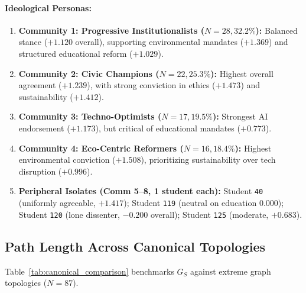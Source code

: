 \documentclass[10pt,twocolumn,a4paper]{article}
\begin{document}
\paragraph{Ideological Personas:}
\begin{enumerate}[noitemsep,topsep=1pt,leftmargin=1.2em]
    \item \textbf{Community 1: Progressive Institutionalists ($N = 28, 32.2\%$):} Balanced stance ($+1.120$ overall), supporting environmental mandates ($+1.369$) and structured educational reform ($+1.029$).
    \item \textbf{Community 2: Civic Champions ($N = 22, 25.3\%$):} Highest overall agreement ($+1.239$), with strong conviction in ethics ($+1.473$) and sustainability ($+1.412$).
    \item \textbf{Community 3: Techno-Optimists ($N = 17, 19.5\%$):} Strongest AI endorsement ($+1.173$), but critical of educational mandates ($+0.773$).
    \item \textbf{Community 4: Eco-Centric Reformers ($N = 16, 18.4\%$):} Highest environmental conviction ($+1.508$), prioritizing sustainability over tech disruption ($+0.996$).
    \item \textbf{Peripheral Isolates (Comm 5--8, 1 student each):} Student \texttt{40} (uniformly agreeable, $+1.417$); Student \texttt{119} (neutral on education $0.000$); Student \texttt{120} (lone dissenter, $-0.200$ overall); Student \texttt{125} (moderate, $+0.683$).
\end{enumerate}

\subsection{Path Length Across Canonical Topologies}
Table~\ref{tab:canonical_comparison} benchmarks $G_S$ against extreme graph topologies ($N=87$).

\begin{table}[h]
\centering
\small
\caption{Comparison of shortest path length and diameter against canonical graph topologies ($N=87$).}
\label{tab:canonical_comparison}
\end{table}
\end{document}
